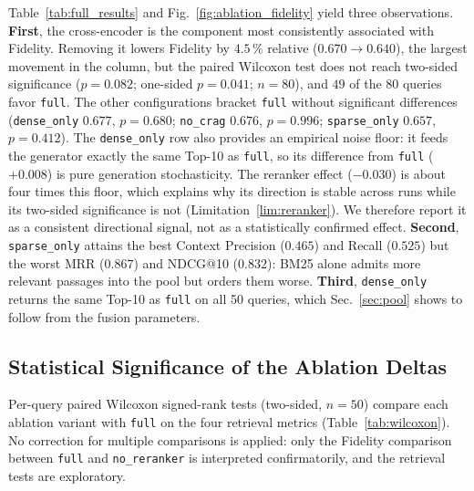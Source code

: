 \documentclass[runningheads]{llncs}
\begin{document}
Table~\ref{tab:full_results} and Fig.~\ref{fig:ablation_fidelity} yield three observations. \textbf{First}, the cross-encoder is the component most consistently associated with Fidelity. Removing it lowers Fidelity by $4.5\,\%$ relative ($0.670 \rightarrow 0.640$), the largest movement in the column, but the paired Wilcoxon test does not reach two-sided significance ($p{=}0.082$; one-sided $p{=}0.041$; $n{=}80$), and $49$ of the $80$ queries favor \texttt{full}. The other configurations bracket \texttt{full} without significant differences (\texttt{dense\_only} $0.677$, $p{=}0.680$; \texttt{no\_crag} $0.676$, $p{=}0.996$; \texttt{sparse\_only} $0.657$, $p{=}0.412$). The \texttt{dense\_only} row also provides an empirical noise floor: it feeds the generator exactly the same Top-10 as \texttt{full}, so its difference from \texttt{full} ($+0.008$) is pure generation stochasticity. The reranker effect ($-0.030$) is about four times this floor, which explains why its direction is stable across runs while its two-sided significance is not (Limitation~\ref{lim:reranker}). We therefore report it as a consistent directional signal, not as a statistically confirmed effect. \textbf{Second}, \texttt{sparse\_only} attains the best Context Precision ($0.465$) and Recall ($0.525$) but the worst MRR ($0.867$) and NDCG@10 ($0.832$): BM25 alone admits more relevant passages into the pool but orders them worse. \textbf{Third}, \texttt{dense\_only} returns the same Top-10 as \texttt{full} on all 50 queries, which Sec.~\ref{sec:pool} shows to follow from the fusion parameters.

\subsection{Statistical Significance of the Ablation Deltas}
\label{sec:wilcoxon}

Per-query paired Wilcoxon signed-rank tests (two-sided, $n{=}50$) compare each ablation variant with \texttt{full} on the four retrieval metrics (Table~\ref{tab:wilcoxon}). No correction for multiple comparisons is applied: only the Fidelity comparison between \texttt{full} and \texttt{no\_reranker} is interpreted confirmatorily, and the retrieval tests are exploratory.
\end{document}
